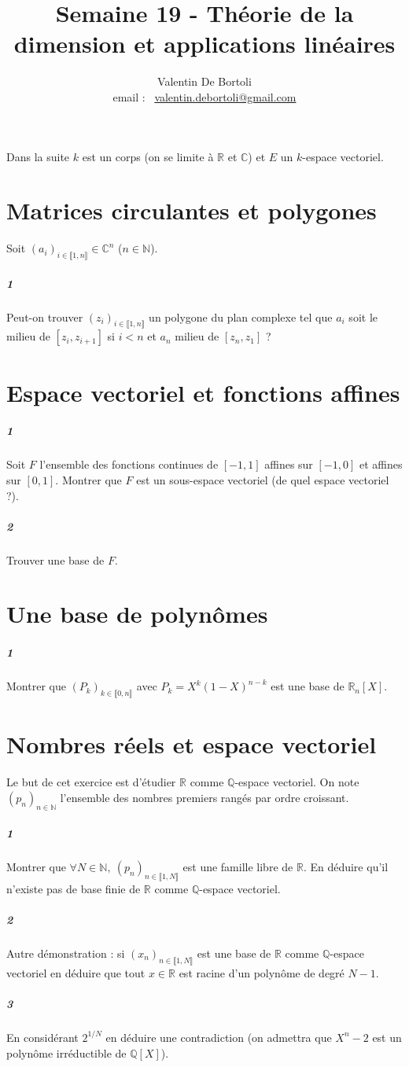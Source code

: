 \documentclass[10pt,a4paper]{article}
\title{Semaine 19 - Théorie de la dimension et applications linéaires}
\author{Valentin De Bortoli \\ email : \ \href{mailto:valentin.debortoli@gmail.com}{valentin.debortoli@gmail.com}}
\date{}
\begin{document}
\maketitle
Dans la suite $k$ est un corps (on se limite à $\mathbb{R}$ et $\mathbb{C}$) et $E$ un $k$-espace vectoriel.

\section{Matrices circulantes et polygones}
Soit $(a_i)_{i \in \llbracket 1,n\rrbracket} \in \mathbb{C}^n$ ($n \in \mathbb{N}$).
\subparagraph{1}Peut-on trouver $(z_i)_{i \in \llbracket 1,n \rrbracket}$ un polygone du plan complexe tel que $a_i$ soit le milieu de $[z_i,z_{i+1}]$ si $i<n$ et $a_n$ milieu de $[z_n,z_1]$ ?

\section{Espace vectoriel et fonctions affines}
\subparagraph{1}Soit $F$ l'ensemble des fonctions continues de $[-1,1]$ affines sur $[-1,0]$ et affines sur $[0,1]$. Montrer que $F$ est un sous-espace vectoriel (de quel espace vectoriel ?).
\subparagraph{2}Trouver une base de $F$. 

\section{Une base de polynômes}
\subparagraph{1}Montrer que $(P_k)_{k \in \llbracket 0,n \rrbracket}$ avec $P_k=X^k(1-X)^{n-k}$ est une base de $\mathbb{R}_n[X]$. 

\section{Nombres réels et espace vectoriel}
Le but de cet exercice est d'étudier $\mathbb{R}$ comme $\mathbb{Q}$-espace vectoriel. On note $(p_n)_{n \in \mathbb{N}}$ l'ensemble des nombres premiers rangés par ordre croissant.
\subparagraph{1} Montrer que $\forall N \in \mathbb{N}, \ (p_n)_{n \in \llbracket 1,N \rrbracket}$ est une famille libre de $\mathbb{R}$. En déduire qu'il n'existe pas de base finie de $\mathbb{R}$ comme $\mathbb{Q}$-espace vectoriel.
\subparagraph{2} Autre démonstration : si $(x_n)_{n \in \llbracket 1,N \rrbracket}$ est une base de $\mathbb{R}$ comme $\mathbb{Q}$-espace vectoriel en déduire que tout $x\in \mathbb{R}$ est racine d'un polynôme de degré $N-1$.
\subparagraph{3}En considérant $2^{1/N}$ en déduire une contradiction (on admettra que $X^n-2$ est un polynôme irréductible de $\mathbb{Q}[X]$).
\end{document}
